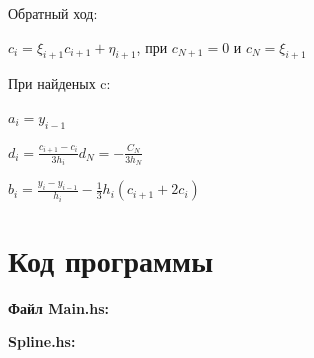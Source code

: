 \documentclass[a4paper,12pt]{article}
\begin{document}
\begin{flushleft}
Обратный ход:
\begin{center}
\begin{minipage}{0.6\textwidth}
$c_{i} = \xi_{i + 1}c_{i + 1} + \eta_{i + 1}$, при $c_{N + 1} = 0$ и $c_{N} = \xi_{i + 1}$
\end{minipage}
\end{center}

При найденых c:

\begin{center}
\begin{minipage}{0.6\textwidth}
$a_{i} = y_{i - 1} $ \newline

$d_{i} = \frac{c_{i + 1} - c_{i}}{3h_{i}}d_{N} = -\frac{C_{N}}{3h_{N}}$ \newline

$b_{i} = \frac{y_{i} - y_{i - 1}}{h_{i}} - \frac{1}{3}h_{i}(c_{i + 1} + 2c_{i})$
\end{minipage}
\end{center}
\end{flushleft}


\clearpage %

\section{Код программы}
\noindent\textbf{Файл Main.hs:}


\noindent\textbf{ Spline.hs:}

\end{document}
